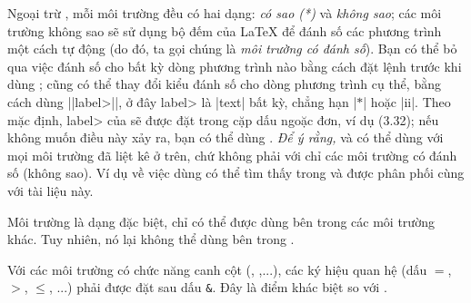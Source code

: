 Ngoại trừ , mỗi môi trường đều có hai dạng:
\emph{có sao (*)} và \emph{không sao};
các môi trường không sao sẽ sử dụng bộ đếm  của \LaTeX{}
để đánh số các phương trình một cách tự động (do đó, ta gọi
chúng là \emph{môi trường có đánh số}).
Bạn có thể bỏ qua việc đánh số cho bất kỳ dòng phương trình nào
bằng cách đặt lệnh  trước khi dùng \cn{\\};
cũng có thể thay đổi kiểu đánh số cho dòng phương trình cụ thể, bằng
cách dùng |{|\<label>|}|, ở đây \<label> là |text| bất kỳ,
chẳng hạn |$*$| hoặc |ii|. Theo mặc định, \<label> của  sẽ được
đặt trong cặp dấu ngoặc đơn, ví dụ (3.32);
nếu không muốn điều này xảy ra, bạn có thể dùng .
\emph{Để ý rằng,}
 và  có thể dùng với mọi môi trường đã liệt kê ở trên,
chứ không phải với chỉ các môi trường có đánh số (không sao).
Ví dụ về việc dùng  có thể tìm thấy trong 
và  được phân phối cùng với tài liệu này.

\medskip
Môi trường  là dạng đặc biệt, chỉ có thể được dùng
bên trong các môi trường khác. Tuy nhiên, nó lại không thể dùng bên
trong .

\medskip
Với các môi trường có chức năng canh cột (, ,...),
các ký hiệu quan hệ (dấu $=$, $>$, $\le$, ...) phải được đặt sau dấu \verb'&'.
Đây là điểm khác biệt so với .

